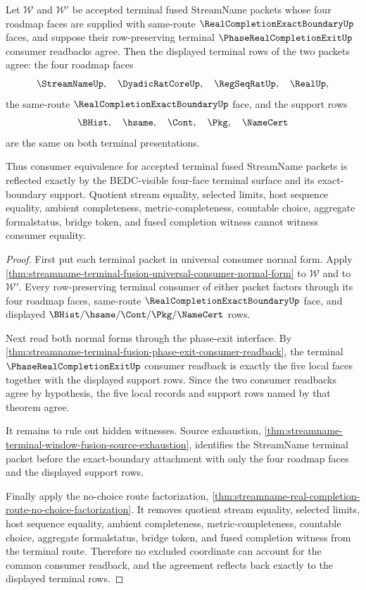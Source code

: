 \begin{theorem}
\label{thm:streamname-terminal-fusion-universal-consumer-reflection}
Let $\mathcal W$ and $\mathcal W'$ be accepted terminal fused StreamName packets
whose four roadmap faces are supplied with same-route
$\RealCompletionExactBoundaryUp$ faces, and suppose their row-preserving
terminal $\PhaseRealCompletionExitUp$ consumer readbacks agree. Then the
displayed terminal rows of the two packets agree: the four roadmap faces
$$
\StreamNameUp,\quad \DyadicRatCoreUp,\quad \RegSeqRatUp,\quad \RealUp,
$$
the same-route $\RealCompletionExactBoundaryUp$ face, and the support rows
$$
\BHist,\quad \hsame,\quad \Cont,\quad \Pkg,\quad \NameCert
$$
are the same on both terminal presentations.

Thus consumer equivalence for accepted terminal fused StreamName packets is
reflected exactly by the BEDC-visible four-face terminal surface and its
exact-boundary support. Quotient stream equality, selected limits, host sequence
equality, ambient completeness, metric-completeness, countable choice, aggregate
formalstatus, bridge token, and fused completion witness cannot witness
consumer equality.
\end{theorem}
\begin{proof}
First put each terminal packet in universal consumer normal form. Apply
\autoref{thm:streamname-terminal-fusion-universal-consumer-normal-form} to
$\mathcal W$ and to $\mathcal W'$. Every row-preserving terminal consumer of
either packet factors through its four roadmap faces, same-route
$\RealCompletionExactBoundaryUp$ face, and displayed
$\BHist/\hsame/\Cont/\Pkg/\NameCert$ rows.

Next read both normal forms through the phase-exit interface. By
\autoref{thm:streamname-terminal-fusion-phase-exit-consumer-readback}, the
terminal $\PhaseRealCompletionExitUp$ consumer readback is exactly the five
local faces together with the displayed support rows. Since the two consumer
readbacks agree by hypothesis, the five local records and support rows named by
that theorem agree.

It remains to rule out hidden witnesses. Source exhaustion,
\autoref{thm:streamname-terminal-window-fusion-source-exhaustion}, identifies
the StreamName terminal packet before the exact-boundary attachment with only
the four roadmap faces and the displayed support rows.

Finally apply the no-choice route factorization,
\autoref{thm:streamname-real-completion-route-no-choice-factorization}. It
removes quotient stream equality, selected limits, host sequence equality,
ambient completeness, metric-completeness, countable choice, aggregate
formalstatus, bridge token, and fused completion witness from the terminal
route. Therefore no excluded coordinate can account for the common consumer
readback, and the agreement reflects back exactly to the displayed terminal
rows.
\end{proof}

